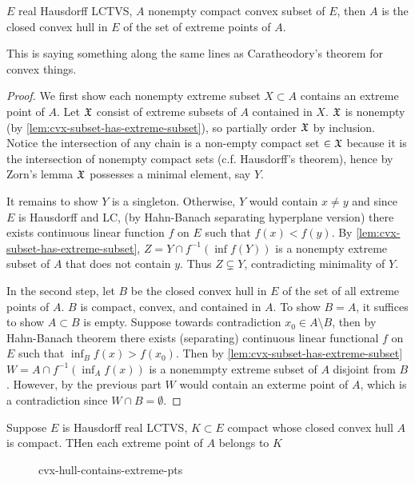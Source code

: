 \begin{theorem}
  $E$ real Hausdorff LCTVS, $A$ nonempty compact convex subset of $E$, then
  $A$ is the closed convex hull in $E$ of the set of extreme points of $A$.
\end{theorem}

This is saying something along the same lines as Caratheodory's theorem
for convex things.

\begin{proof}
  We first show each nonempty extreme subset $X \subset A$ contains an extreme
  point of $A$. Let $\mathfrak{X}$ consist of extreme subsets of $A$ contained in $X$.
  $\mathfrak{X}$ is nonempty (by \cref{lem:cvx-subset-has-extreme-subset}),
  so partially order $\mathfrak{X}$ by inclusion.
  Notice the intersection of any chain is a non-empty compact set $\in \mathfrak{X}$
  because it is
  the intersection of nonempty compact sets (c.f. Hausdorff's theorem), hence
  by Zorn's lemma $\mathfrak{X}$ possesses a minimal element, say $Y$.

  It remains to show $Y$ is a singleton. Otherwise, $Y$ would contain $x \neq y$
  and since $E$ is Hausdorff and LC, (by Hahn-Banach separating hyperplane version)
  there exists continuous linear function $f$ on $E$ such that $f(x) < f(y)$.
  By \cref{lem:cvx-subset-has-extreme-subset}, $Z = Y \cap f^{-1}(\inf f(Y))$
  is a nonempty extreme subset of $A$ that does not contain $y$.
  Thus $Z \subsetneq Y$, contradicting minimality of $Y$.

  In the second step, let $B$ be the closed convex hull in $E$ of the set of all extreme points of $A$.
  $B$ is compact, convex, and contained in $A$.
  To show $B = A$, it suffices to show $A \subset B$ is empty.
  Suppose towards contradiction $x_0 \in A \setminus B$, then by Hahn-Banach
  theorem there exists (separating) continuous linear functional
  $f$ on $E$ such that $\inf_B f(x) > f(x_0)$.
  Then by \cref{lem:cvx-subset-has-extreme-subset} $W = A \cap f^{-1}(\inf_A f(x))$
  is a nonemmpty extreme subset of $A$ disjoint from $B$.
  However, by the previous part $W$ would contain an exterme point of $A$,
  which is a contradiction since $W \cap B = \emptyset$.
\end{proof}

\begin{proposition}
  Suppose $E$ is Hausdorff real LCTVS, $K \subset E$ compact whose closed
  convex hull $A$ is compact. THen each extreme point of $A$ belongs to $K$
\end{proposition}

\begin{figure}[ht]
    \centering
    \caption{cvx-hull-contains-extreme-pts}
    \label{fig:cvx-hull-contains-extreme-pts}
\end{figure}


